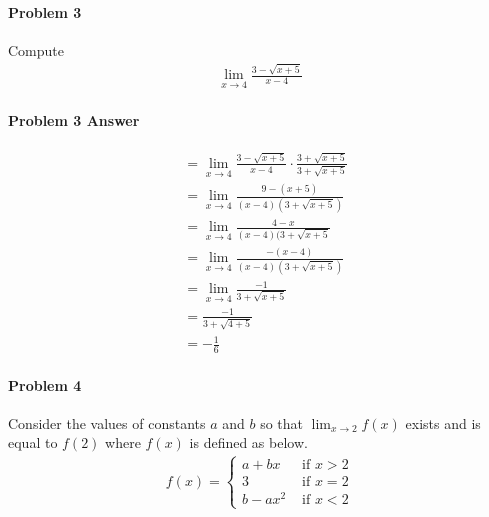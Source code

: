 \documentclass[a4paper, 11pt]{article}
\begin{document}

\paragraph{Problem 3}
Compute
\begin{align}
    \lim_{x\rightarrow 4} \frac{3-\sqrt{x+5}}{x-4}  \nonumber
\end{align}


\paragraph{Problem 3 Answer}
\begin{align}
    &= \lim_{x\rightarrow 4} \frac{3-\sqrt{x+5}}{x-4} \cdot \frac{3+\sqrt{x+5}}{3 + \sqrt{x+5}}  \nonumber \\
    &= \lim_{x\rightarrow 4} \frac{9-(x+5)}{(x-4)(3+\sqrt{x+5})} \nonumber \\
    &= \lim_{x\rightarrow 4} \frac{4-x}{(x-4)(3 + \sqrt{x + 5}} \nonumber \\
    &= \lim_{x\rightarrow 4} \frac{-(x-4)}{(x-4)(3 + \sqrt{x + 5})} \nonumber \\
    &= \lim_{x\rightarrow 4} \frac{-1}{3 + \sqrt{x+5}} \nonumber \\
    &= \frac{-1}{3 + \sqrt{4 + 5}} \nonumber \\
    &= -\frac{1}{6} \nonumber 
\end{align}


\paragraph{Problem 4}
Consider the values of constants $a$ and $b$ so that $\lim_{x \rightarrow 2} f(x)$ exists and is equal to $f(2)$ where $f(x)$ is defined as below.
\begin{align}
    f(x) = \begin{cases}
    			a + bx & \text{ if } x > 2 \\
    			3 & \text{ if } x=2 \\
    			b-ax^2 & \text{ if } x < 2
    	   \end{cases}  \nonumber
\end{align}
\end{document}
